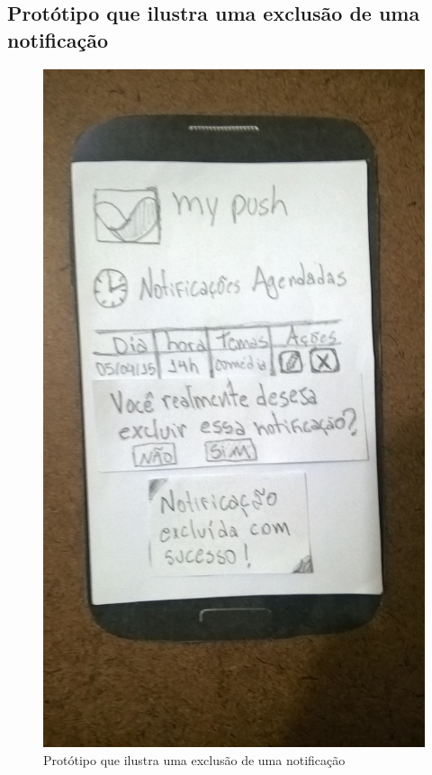 \begin{apendicesenv}
  \pagebreak
  \section*{Protótipo que ilustra uma exclusão de uma notificação}

    \begin{figure}[!htbp]
      \centering
      \includegraphics[scale=0.32, angle=-90]{editaveis/figuras/prototipo_papel_v2/confirmacao_exclusao_notificacao}
      \caption{Protótipo que ilustra uma exclusão de uma notificação}
      \label{confirmacao_exclusao_notificacao_v2}
    \end{figure}
  

\end{apendicesenv}
